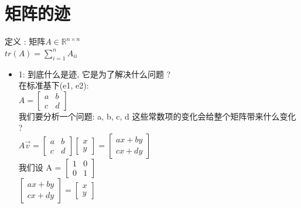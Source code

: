\documentclass[12pt]{article}
\begin{document}
\section{矩阵的迹}
\begin{flushleft}
    定义 : 矩阵$A \in \mathbb{R}^{n \times n}$ \\
    $tr(A) = \sum_{i = 1}^{n} A_{ii}$
    \begin{itemize}
        \item 1: 到底什么是迹, 它是为了解决什么问题 ? \\
              在标准基下(e1, e2): \\
              $A = \begin{bmatrix}
                      a & b \\
                      c & d
                  \end{bmatrix}$\\
              我们要分析一个问题: a, b, c, d 这些常数项的变化会给整个矩阵带来什么变化 ?  \\
              $A\vec{v}  = \begin{bmatrix}
                      a & b \\
                      c & d
                  \end{bmatrix}\begin{bmatrix}
                      x \\
                      y
                  \end{bmatrix} = \begin{bmatrix}
                      ax + by \\
                      cx + dy
                  \end{bmatrix}$ \\
              我们设 A = $\begin{bmatrix}
                      1 & 0 \\
                      0 & 1
                  \end{bmatrix}$ \\
              $ \begin{bmatrix}
                      ax + by \\
                      cx + dy
                  \end{bmatrix} = \begin{bmatrix}
                      x \\
                      y
                  \end{bmatrix}$ \\

\end{itemize}
\end{flushleft}
\end{document}

